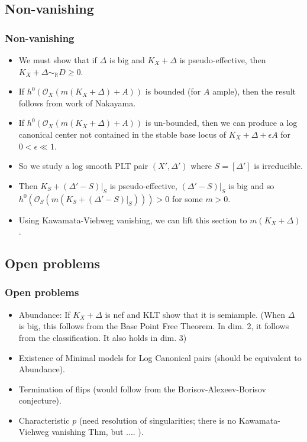 \documentclass{beamer}
\theoremstyle{plain}
\theoremstyle{definition}
\theoremstyle{remark}
\def\OO{\mathcal {O}}
\begin{document}
\subsection{Non-vanishing}
\begin{frame}
\frametitle{Non-vanishing}
\begin{itemize} 
\item We must show that if $\Delta$ is big and $K_X+\Delta$ is 
pseudo-effective, then $K_X+\Delta \sim _{\mathbb {R}}D\geq 0$.
\item If $h^0(\OO _X(m(K_X+\Delta)+A))$ is bounded (for $A$ ample),
then the result follows from work of Nakayama.
\item If $h^0(\OO _X(m(K_X+\Delta)+A))$ is un-bounded, then we can produce a
log canonical center not contained in the stable base locus of
$K_X+\Delta+\epsilon A$ for $0<\epsilon \ll 1$.
\item So we study a log smooth PLT pair $(X',\Delta ')$ where $S=[\Delta ']$
is irreducible.
\item Then $K_S+(\Delta '-S)|_S$ is pseudo-effective, $(\Delta '-S)|_S$ is 
big and so $h^0(\OO _S(m(K_S+(\Delta '-S)|_S)))>0$ for some $m>0$.
\item Using Kawamata-Viehweg vanishing, we can lift this section to $m(K_X+\Delta)$.
\end{itemize}

\end{frame}
\subsection{Open problems}
\begin{frame}
\frametitle{Open problems}
\begin{itemize}
\item Abundance: If $K_X+\Delta$ is nef and KLT show that it is semiample.
(When $\Delta$ is big, this follows from the Base Point Free Theorem.
In dim. 2, it follows from the classification. It also holds in dim. 3)
\item Existence of Minimal models for Log Canonical pairs (should be equivalent to Abundance).
\item Termination of flips (would follow from the Borisov-Alexeev-Borisov
conjecture).
\item Characteristic $p$ (need resolution of singularities; there is no Kawamata-Viehweg vanishing Thm, but .... ).
\end{itemize}
\end{frame}
\end{document}
